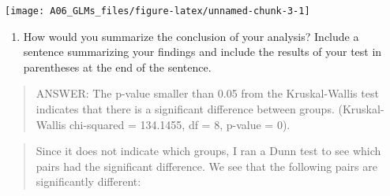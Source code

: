\documentclass[]{article}
\newenvironment{Shaded}{\begin{snugshade}}{\end{snugshade}}
\newcommand{\KeywordTok}[1]{\textcolor[rgb]{0.13,0.29,0.53}{\textbf{#1}}}
\newcommand{\DataTypeTok}[1]{\textcolor[rgb]{0.13,0.29,0.53}{#1}}
\newcommand{\DecValTok}[1]{\textcolor[rgb]{0.00,0.00,0.81}{#1}}
\newcommand{\StringTok}[1]{\textcolor[rgb]{0.31,0.60,0.02}{#1}}
\newcommand{\CommentTok}[1]{\textcolor[rgb]{0.56,0.35,0.01}{\textit{#1}}}
\newcommand{\OtherTok}[1]{\textcolor[rgb]{0.56,0.35,0.01}{#1}}
\newcommand{\OperatorTok}[1]{\textcolor[rgb]{0.81,0.36,0.00}{\textbf{#1}}}
\newcommand{\NormalTok}[1]{#1}
\providecommand{\tightlist}{%
  \setlength{\itemsep}{0pt}\setlength{\parskip}{0pt}}
\begin{document}
\begin{Shaded}
\end{Shaded}

\begin{center}\texttt{[image: A06\_GLMs\_files/figure-latex/unnamed-chunk-3-1]} \end{center}

\begin{enumerate}
\def\labelenumi{\arabic{enumi}.}
\setcounter{enumi}{8}
\tightlist
\item
  How would you summarize the conclusion of your analysis? Include a
  sentence summarizing your findings and include the results of your
  test in parentheses at the end of the sentence.
\end{enumerate}

\begin{quote}
ANSWER: The p-value smaller than 0.05 from the Kruskal-Wallis test
indicates that there is a significant difference between groups.
(Kruskal-Wallis chi-squared = 134.1455, df = 8, p-value = 0).
\end{quote}

\begin{quote}
Since it does not indicate which groups, I ran a Dunn test to see which
pairs had the significant difference. We see that the following pairs
are significantly different:
\end{quote}
\end{document}
